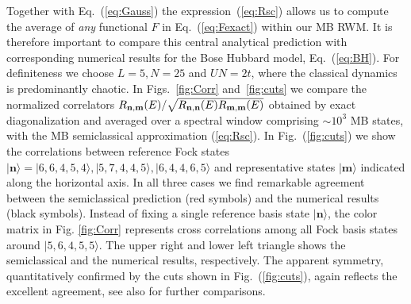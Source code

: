 \documentclass[prl,a4paper,twocolumn,superscriptaddress,floatfix]{revtex4-1}%
\begin{document}
Together with Eq.~(\ref{eq:Gauss}) the  expression~(\ref{eq:Rsc}) allows us to compute the average of \textit{any} functional $F$ in Eq.~(\ref{eq:Fexact}) within our MB RWM. It is therefore important to compare this central analytical prediction with corresponding numerical results for the Bose Hubbard model, Eq.~(\ref{eq:BH}). For definiteness we choose $L=5,N=25$ and $UN=2t$, where the classical dynamics is predominantly chaotic. In Figs.~\ref{fig:Corr} and~\ref{fig:cuts} we compare the normalized correlators $R_{{\bf n},{\bf m}}(E)/\sqrt{R_{{\bf n},{\bf n}}(E)R_{{\bf m},{\bf m}}(E)}$ obtained by exact diagonalization and averaged over a spectral window comprising $\sim 10^{3}$ MB states, with the MB semiclassical approximation (\ref{eq:Rsc}). In Fig.~(\ref{fig:cuts}) we show the correlations between reference Fock states  $|\mathbf n\rangle =|6,6,4,5,4\rangle, |5,7,4,4,5\rangle,|6,4,4,6,5\rangle$ and representative states $|\mathbf m\rangle$ indicated along the horizontal axis. In all three cases we find remarkable agreement between the semiclassical prediction (red symbols) and the numerical results (black symbols). Instead of fixing a single reference basis state $|\mathbf n\rangle$,  the color matrix in Fig. \ref{fig:Corr} represents cross correlations among all Fock basis states around $|5,6,4,5,5\rangle$. The upper right and lower left triangle shows the semiclassical and the numerical results, respectively. The apparent symmetry, quantitatively confirmed by the cuts shown in Fig.~(\ref{fig:cuts}), again reflects the excellent agreement, see also \cite{suppmat} for further comparisons. 

\end{document}
